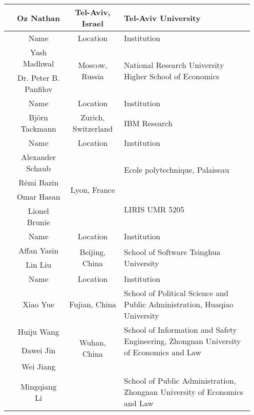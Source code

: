 \begin{longtable}{ |c|c|c|p{5cm}| }
	 \cline{2-4}
	 & Oz Nathan & {\centering Tel-Aviv, Israel} & {\centering Tel-Aviv University} \\
	\hline
	\multirow{3}{*}{\cite{2017_Madhwal}} & \cellcolor{Gray}Name & \cellcolor{Gray}Location & \cellcolor{Gray}Institution \\ 
 	\cline{2-4}
	& Yash Madhwal & \multirow{2}{*}{\centering Moscow, Russia} & \multirow{2}{*}{\parbox{5cm}{\centering National Research University Higher School of Economics}}  \\
	\cline{2-2}
	 & Dr. Peter B. Panfilov &   &  \\
	 \hline
	 \multirow{2}{*}{\cite{2017_Tackmann}} & \cellcolor{Gray}Name & \cellcolor{Gray}Location & \cellcolor{Gray}Institution \\ 
 	\cline{2-4}
	 & Bj\"{o}rn Tackmann & Zurich, Switzerland  & IBM Research  \\
	 \hline
	 \multirow{5}{*}{\cite{2016_Schaub}} & \cellcolor{Gray}Name & \cellcolor{Gray}Location & \cellcolor{Gray}Institution \\ 
 	\cline{2-4}
	 & Alexander Schaub & \multirow{4}{*}{\parbox{5cm}{\centering Lyon, France}}  & \multirow{2}{*}{\parbox{5cm}{\centering Ecole polytechnique, Palaiseau}}  \\
	\cline{2-2}
	 & Rémi Bazin &   & \\
	 \cline{2-2}
	 \cline{4-4}
	 & Omar Hasan & & \multirow{2}{*}{\parbox{5cm}{\centering LIRIS UMR 5205}} \\
	 \cline{2-2}
	  & Lionel Brunie & & \\
	 \hline	
	 \multirow{3}{*}{\cite{2016_Yasin}} & \cellcolor{Gray}Name & \cellcolor{Gray}Location & \cellcolor{Gray}Institution \\ 
 	\cline{2-4}
	 & Affan Yasin & \multirow{2}{*}{\parbox{5cm}{\centering Beijing, China}}  & \multirow{2}{*}{\parbox{5cm}{\centering School of Software Tsinghua University}} \\
	\cline{2-2}
	 & Lin Liu &  & \\
	 \hline
	 \multirow{6}{*}{\cite{2016_Yue}} & \cellcolor{Gray}Name & \cellcolor{Gray}Location & \cellcolor{Gray}Institution \\ 
 	\cline{2-4}
	 & Xiao Yue & Fujian, China   &  School of Political Science and Public Administration, Huaqiao University \\
	\cline{2-4}
	& Huiju Wang & \multirow{3}{*}{ Wuhan, China} & \multirow{2}{*}{{\parbox{5cm}{\centering School of Information and Safety Engineering, Zhongnan University of Economics and Law}}} \\
	 \cline{2-2}
	 & Dawei Jin & & \\
	 \cline{2-2}
	 & Wei Jiang & & \\
	 \cline{2-2}
	 \cline{4-4} 
	 & Mingqiang Li & & School of Public Administration, Zhongnan University of Economics and Law\\
	 \hline
\end{longtable}

